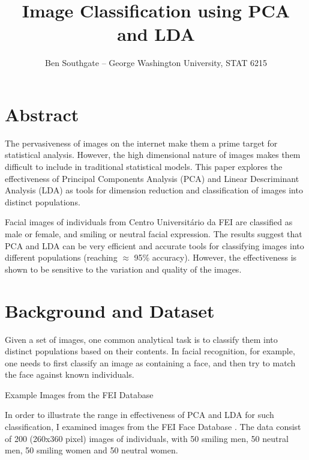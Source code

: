 \documentclass{article}
\title{\vspace{-2cm}Image Classification using PCA and LDA}
\author{\vspace{-1cm} Ben Southgate -- George Washington University, STAT 6215}
\date{}
\begin{document}
  \begin{multicols}{2}
  [
  \maketitle
  ]
  \section*{Abstract}
  The pervasiveness of images on the internet make them a prime target for statistical analysis. However, the high dimensional nature of images makes them difficult to include in traditional statistical models. This paper explores the effectiveness of Principal Components Analysis (PCA) and Linear Descriminant Analysis (LDA) as tools for dimension reduction and classification of images into distinct populations. 
  
  Facial images of individuals from Centro Universit\'{a}rio da FEI are classified as male or female, and smiling or neutral facial expression. The results suggest that PCA and LDA can be very efficient and accurate tools for classifying images into different populations (reaching $\approx$ 95\% accuracy). However, the effectiveness is shown to be sensitive to the variation and quality of the images.

  \section{Background and Dataset}
  Given a set of images, one common analytical task is to classify them into distinct populations based on their contents. In facial recognition, for example, one needs to first classify an image as containing a face, and then try to match the face against known individuals.
  
  \noindent
  \begin{minipage}{\columnwidth}
    \makeatletter
    \newcommand{\@captype}{figure}
    \makeatother
    \centering
    \qquad%
    \caption{Example Images from the FEI Database}
  \end{minipage}
  
  \vspace{1em}
  In order to illustrate the range in effectiveness of PCA and LDA for such classification, I examined images from the FEI Face Database \cite{fei}. The data consist of 200 (260x360 pixel) images of individuals, with 50 smiling men, 50 neutral men, 50 smiling women and 50 neutral women.
  

\end{multicols}
\end{document}
